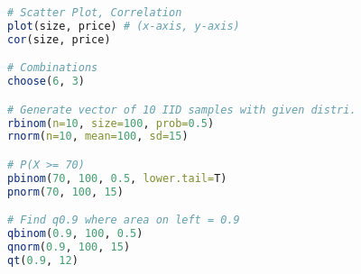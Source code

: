 \documentclass{article}
\begin{document}
\begin{multicols*}{4}
\begin{lstlisting}[language=R, breaklines=true]
# Scatter Plot, Correlation
plot(size, price) # (x-axis, y-axis)
cor(size, price)

# Combinations
choose(6, 3)

# Generate vector of 10 IID samples with given distri.
rbinom(n=10, size=100, prob=0.5)
rnorm(n=10, mean=100, sd=15)

# P(X >= 70)
pbinom(70, 100, 0.5, lower.tail=T)
pnorm(70, 100, 15)

# Find q0.9 where area on left = 0.9
qbinom(0.9, 100, 0.5)
qnorm(0.9, 100, 15)
qt(0.9, 12)

\end{lstlisting}

\end{multicols*}
\end{document}
